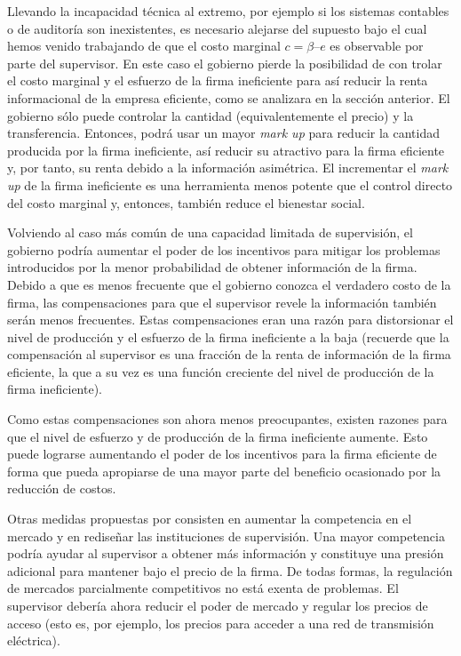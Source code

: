 \documentclass[
  12pt,
  spanish,
]{book}
\begin{document}
Llevando la incapacidad técnica al extremo, por ejemplo si los sistemas
contables o de auditoría son inexistentes, es necesario alejarse del
supuesto bajo el cual hemos venido trabajando de que el costo marginal
\(c = β – e\) es observable por parte del supervisor. En este caso el
gobierno pierde la posibilidad de con trolar el costo marginal y el
esfuerzo de la firma ineficiente para así reducir la renta informacional
de la empresa eficiente, como se analizara en la sección anterior. El
gobierno sólo puede controlar la cantidad (equivalentemente el precio) y
la transferencia. Entonces, podrá usar un mayor \emph{mark up} para
reducir la cantidad producida por la firma ineficiente, así reducir su
atractivo para la firma eficiente y, por tanto, su renta debido a la
información asimétrica. El incrementar el \emph{mark up} de la firma
ineficiente es una herramienta menos potente que el control directo del
costo marginal y, entonces, también reduce el bienestar social.

Volviendo al caso más común de una capacidad limitada de supervisión, el
gobierno podría aumentar el poder de los incentivos para mitigar los
problemas introducidos por la menor probabilidad de obtener información
de la firma. Debido a que es menos frecuente que el gobierno conozca el
verdadero costo de la firma, las compensaciones para que el supervisor
revele la información también serán menos frecuentes. Estas
compensaciones eran una razón para distorsionar el nivel de producción y
el esfuerzo de la firma ineficiente a la baja (recuerde que la
compensación al supervisor es una fracción de la renta de información de
la firma eficiente, la que a su vez es una función creciente del nivel
de producción de la firma ineficiente).

Como estas compensaciones son ahora menos preocupantes, existen razones
para que el nivel de esfuerzo y de producción de la firma ineficiente
aumente. Esto puede lograrse aumentando el poder de los incentivos para
la firma eficiente de forma que pueda apropiarse de una mayor parte del
beneficio ocasionado por la reducción de costos.

Otras medidas propuestas por \citet{Laffont2005} consisten en aumentar
la competencia en el mercado y en rediseñar las instituciones de
supervisión. Una mayor competencia podría ayudar al supervisor a obtener
más información y constituye una presión adicional para mantener bajo el
precio de la firma. De todas formas, la regulación de mercados
parcialmente competitivos no está exenta de problemas. El supervisor
debería ahora reducir el poder de mercado y regular los precios de
acceso (esto es, por ejemplo, los precios para acceder a una red de
transmisión eléctrica).
\end{document}
